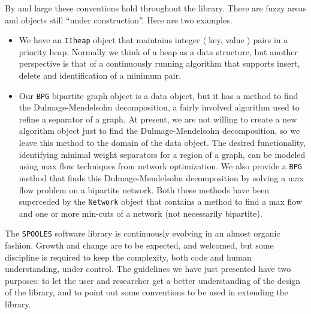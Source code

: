 \par
By and large these conventions hold throughout the library.
There are fuzzy areas and objects still ``under construction''.
Here are two examples.
\begin{itemize}
\item
We have an {\tt IIheap} object that maintains integer 
$\langle$ key, value $\rangle$ pairs in a priority heap.
Normally we think of a heap as a data structure, but another 
perspective is that of a continuously running algorithm that
supports insert, delete and identification of a minimum pair.
\item
Our {\tt BPG} bipartite graph object is a data object, 
but it has a method to find the Dulmage-Mendelsohn decomposition, 
a fairly involved algorithm used to refine a separator of a graph.
At present, we are not willing to create a new algorithm object
just to find the Dulmage-Mendelsohn decomposition, so we leave
this method to the domain of the data object.
The desired functionality, identifying minimal
weight separators for a region of a graph, can be modeled using
max flow techniques from network optimization.
We also provide a {\tt BPG} method that finds this
Dulmage-Mendelsohn decomposition by solving a max flow problem on
a bipartite network.
Both these methods have been superceded by the {\tt Network} object
that contains a method to find a max flow and one or more min-cuts 
of a network (not necessarily bipartite).
\end{itemize}
\par
The {\tt SPOOLES} software library is continuously evolving in an
almost organic fashion.
Growth and change are to be expected, and welcomed, but some
discipline is required to keep the complexity, both code and human
understanding, under control.
The guidelines we have just presented have two purposes:
to let the user and researcher get a better understanding of
the design of the library, and to point out some conventions 
to be used in extending the library.
